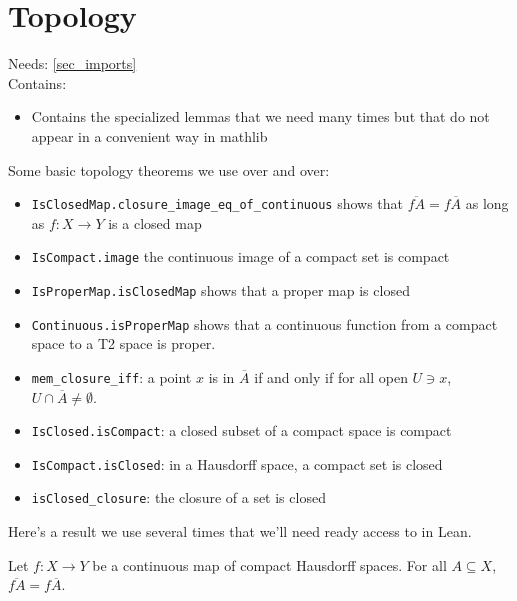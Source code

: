 \section{Topology}
\label{sec_topology}

Needs: \cref{sec_imports}\\

Contains:
\begin{itemize}
    \item Contains the specialized lemmas that we need many times but that do not appear in a convenient way in mathlib
\end{itemize}

\begin{leanrmk}
    Some basic topology theorems we use over and over:
    \begin{itemize}
        \item \verb|IsClosedMap.closure_image_eq_of_continuous| shows that $\overline{fA} = f\overline{A}$ as long as $f: X \to Y$ is a closed map
        
        \item \verb|IsCompact.image| the continuous image of a compact set is compact

        \item \verb|IsProperMap.isClosedMap| shows that a proper map is closed

        \item \verb|Continuous.isProperMap| shows that a continuous function from a compact space to a T2 space is proper.

        \item \verb|mem_closure_iff|: a point $x$ is in $\overline{A}$ if and only if for all open $U \ni x$, $U \cap \overline{A} \neq \emptyset$.

        \item \verb|IsClosed.isCompact|: a closed subset of a compact space is compact

        \item \verb|IsCompact.isClosed|: in a Hausdorff space, a compact set is closed

        \item \verb|isClosed_closure|: the closure of a set is closed
    \end{itemize}
\end{leanrmk}

Here's a result we use several times that we'll need ready access to in Lean.

\begin{lemma}
\label{lemma_image_closure_equals_closure_image}
 \leanok{}
    Let $f: X \to Y$ be a continuous map of compact Hausdorff spaces.  For all $A \subseteq X$, $\overline{fA} = f \overline{A}$.
\end{lemma}

